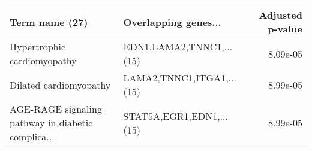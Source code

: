 \begin{tabular}{llr}
\toprule
                                    Term name (27) &      Overlapping genes... &  Adjusted p-value \\
\midrule
                       Hypertrophic cardiomyopathy &  EDN1,LAMA2,TNNC1,...(15) &          8.09e-05 \\
                            Dilated cardiomyopathy & LAMA2,TNNC1,ITGA1,...(15) &          8.99e-05 \\
AGE-RAGE signaling pathway in diabetic complica... &  STAT5A,EGR1,EDN1,...(15) &          8.99e-05 \\
\bottomrule
\end{tabular}
